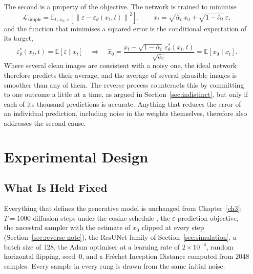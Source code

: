 The second is a property of the objective. The network is trained to minimise
\begin{equation}
    \mathcal{L}_{\text{simple}} = \mathbb{E}_{t,\,x_0,\,\varepsilon}
    \left[\left\lVert \varepsilon - \varepsilon_\theta(x_t, t) \right\rVert^2\right],
    \qquad x_t = \sqrt{\bar\alpha_t}\,x_0 + \sqrt{1-\bar\alpha_t}\,\varepsilon,
    \label{eq:ext-simple-loss}
\end{equation}
and the function that minimises a squared error is the conditional expectation of its target,
\begin{equation}
    \varepsilon_\theta^{*}(x_t, t) = \mathbb{E}\left[\varepsilon \mid x_t\right]
    \quad\Longrightarrow\quad
    \hat{x}_0 = \frac{x_t - \sqrt{1-\bar\alpha_t}\,\varepsilon_\theta^{*}(x_t, t)}{\sqrt{\bar\alpha_t}}
    = \mathbb{E}\left[x_0 \mid x_t\right].
    \label{eq:ext-cond-mean}
\end{equation}
Where several clean images are consistent with a noisy one, the ideal network therefore predicts
their average, and the average of several plausible images is smoother than any of them. The
reverse process counteracts this by committing to one outcome a little at a time, as argued in
Section~\ref{sec:indistinct}, but only if each of its thousand predictions is accurate. Anything
that reduces the error of an individual prediction, including noise in the weights themselves,
therefore also addresses the second cause.

\section{Experimental Design}
\label{sec:ext-design}

\subsection{What Is Held Fixed}

Everything that defines the generative model is unchanged from Chapter~\ref{ch3}: $T = 1000$
diffusion steps under the cosine schedule \parencite{arXiv:2102.09672}, the $\varepsilon$-prediction
objective, the ancestral sampler with the estimate of $x_0$ clipped at every step
(Section~\ref{sec:reverse-note}), the ResUNet family of Section~\ref{sec:simulation}, a batch size
of 128, the Adam optimiser \parencite{arXiv:1412.6980} at a learning rate of $2 \times 10^{-4}$,
random horizontal flipping, seed~0, and a Fr\'echet Inception Distance computed from 2048 samples.
Every sample in every rung is drawn from the same initial noise.

